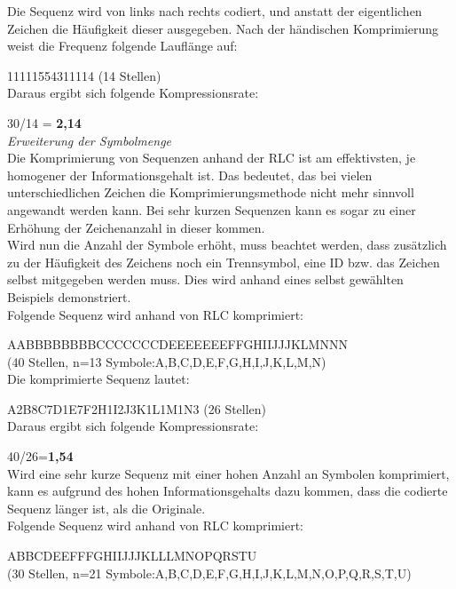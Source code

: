 \documentclass[12pt,german]{article}
\begin{document}
Die Sequenz wird von links nach rechts codiert, und anstatt der eigentlichen Zeichen die Häufigkeit dieser ausgegeben. Nach der händischen Komprimierung weist die Frequenz folgende Lauflänge auf:

11111554311114 (14 Stellen)\\


Daraus ergibt sich folgende Kompressionsrate:

30/14 = \textbf{ 2,14}\\

\textit{Erweiterung der Symbolmenge}\\
Die Komprimierung von Sequenzen anhand der RLC ist am effektivsten, je homogener der Informationsgehalt ist. Das bedeutet, das bei vielen unterschiedlichen Zeichen die Komprimierungsmethode nicht mehr sinnvoll angewandt werden kann. Bei sehr kurzen Sequenzen kann es sogar zu einer Erhöhung der Zeichenanzahl in dieser kommen.\\

Wird nun die Anzahl der Symbole erhöht, muss beachtet werden, dass zusätzlich zu der Häufigkeit des Zeichens noch ein Trennsymbol, eine ID bzw. das Zeichen selbst mitgegeben werden muss. Dies wird anhand eines selbst gewählten Beispiels demonstriert.\\

Folgende Sequenz wird anhand von RLC komprimiert:

AABBBBBBBBCCCCCCCDEEEEEEEFFGHIIJJJKLMNNN\\ (40 Stellen, n=13 Symbole:A,B,C,D,E,F,G,H,I,J,K,L,M,N)\\

Die komprimierte Sequenz lautet:

A2B8C7D1E7F2H1I2J3K1L1M1N3 (26 Stellen)\\

Daraus ergibt sich folgende Kompressionsrate:

40/26=\textbf{1,54}\\

Wird eine sehr kurze Sequenz mit einer hohen Anzahl an Symbolen komprimiert, kann es aufgrund des hohen Informationsgehalts dazu kommen, dass die codierte Sequenz länger ist, als die Originale.\\


Folgende Sequenz wird anhand von RLC komprimiert:

ABBCDEEFFFGHIIJJJKLLLMNOPQRSTU\\ (30 Stellen, n=21 Symbole:A,B,C,D,E,F,G,H,I,J,K,L,M,N,O,P,Q,R,S,T,U)\\
\end{document}
